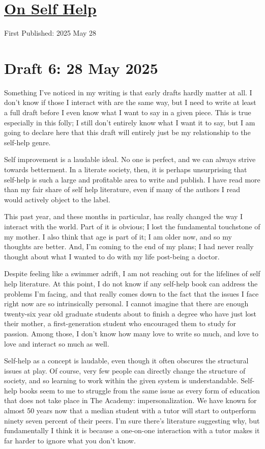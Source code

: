 \documentclass[12pt]{article}
\renewcommand{\,}{\textsuperscript{,}}
\begin{document}
  
\doublespacing  
\section{\href{self-help.html}{On Self Help}}  
First Published: 2025 May 28

\section{Draft 6: 28 May 2025}

Something I've noticed in my writing is that early drafts hardly matter at all.  
I don't know if those I interact with are the same way, but I need to write at least a full draft before I even know what I want to say in a given piece.  
This is true especially in this folly; I still don't entirely know what I want it to say, but I am going to declare here that this draft will entirely just be my relationship to the self-help genre.

Self improvement is a laudable ideal.  
No one is perfect, and we can always strive towards betterment.  
In a literate society, then, it is perhaps unsurprising that self-help is such a large and profitable area to write and publish.  
I have read more than my fair share of self help literature, even if many of the authors I read would actively object to the label.

This past year, and these months in particular, has really changed the way I interact with the world.  
Part of it is obvious; I lost the fundamental touchstone of my mother.  
I also think that age is part of it; I am older now, and so my thoughts are better.  
And, I'm coming to the end of my plans; I had never really thought about what I wanted to do with my life post-being a doctor.

Despite feeling like a swimmer adrift, I am not reaching out for the lifelines of self help literature.  
At this point, I do not know if any self-help book can address the problems I'm facing, and that really comes down to the fact that the issues I face right now are so intrinsically personal.  
I cannot imagine that there are enough twenty-six year old graduate students about to finish a degree who have just lost their mother, a first-generation student who encouraged them to study for passion.  
Among those, I don't know how many love to write so much, and love to love and interact so much as well.

Self-help as a concept is laudable, even though it often obscures the structural issues at play.  
Of course, very few people can directly change the structure of society, and so learning to work within the given system is understandable.  
Self-help books seem to me to struggle from the same issue as every form of education that does not take place in The Academy: impersonalization.  
We have known for almost 50 years now that a median student with a tutor will start to outperform ninety seven percent of their peers.  
I'm sure there's literature suggesting why, but fundamentally I think it is because a one-on-one interaction with a tutor makes it far harder to ignore what you don't know.
\end{document}
